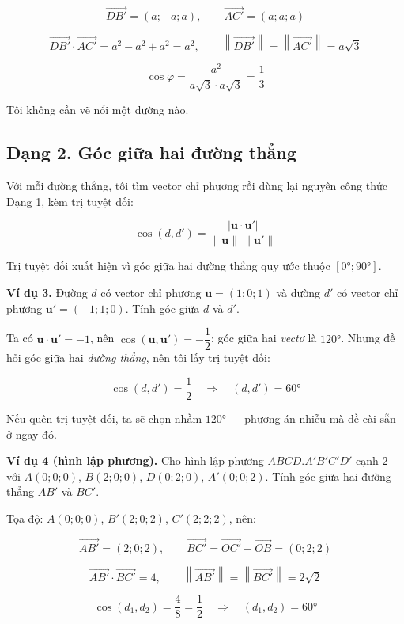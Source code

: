 \documentclass[12pt,a4paper]{article}
\begin{document}
$$
\overrightarrow{DB'} = (a;-a;a),
\qquad
\overrightarrow{AC'} = (a;a;a)
$$

$$
\overrightarrow{DB'}\cdot\overrightarrow{AC'} = a^2-a^2+a^2 = a^2,
\qquad
\left\|\overrightarrow{DB'}\right\| = \left\|\overrightarrow{AC'}\right\| = a\sqrt{3}
$$

$$
\cos\varphi = \frac{a^2}{a\sqrt{3}\cdot a\sqrt{3}} = \frac{1}{3}
$$

Tôi không cần vẽ nổi một đường nào.

\subsection*{Dạng 2. Góc giữa hai đường thẳng}

Với mỗi đường thẳng, tôi tìm vector chỉ phương rồi dùng lại nguyên công thức Dạng 1, kèm trị tuyệt đối:

$$
\cos(d,d') = \frac{|\mathbf{u}\cdot \mathbf{u}'|}{\|\mathbf{u}\|\,\|\mathbf{u}'\|}
$$

Trị tuyệt đối xuất hiện vì góc giữa hai đường thẳng quy ước thuộc $[0°;90°]$.

\textbf{Ví dụ 3.} Đường $d$ có vector chỉ phương $\mathbf{u}=(1;0;1)$ và đường $d'$ có vector chỉ phương $\mathbf{u}'=(-1;1;0)$. Tính góc giữa $d$ và $d'$.

Ta có $\mathbf{u}\cdot\mathbf{u}' = -1$, nên $\cos(\mathbf{u},\mathbf{u}') = -\dfrac{1}{2}$: góc giữa hai \emph{vectơ} là $120°$. Nhưng đề hỏi góc giữa hai \emph{đường thẳng}, nên tôi lấy trị tuyệt đối:

$$
\cos(d,d') = \frac{1}{2}
\quad\Longrightarrow\quad
(d,d') = 60°
$$

Nếu quên trị tuyệt đối, ta sẽ chọn nhầm $120°$ --- phương án nhiễu mà đề cài sẵn ở ngay đó.

\textbf{Ví dụ 4 (hình lập phương).} Cho hình lập phương $ABCD.A'B'C'D'$ cạnh $2$ với $A(0;0;0)$, $B(2;0;0)$, $D(0;2;0)$, $A'(0;0;2)$. Tính góc giữa hai đường thẳng $AB'$ và $BC'$.

Tọa độ: $A(0;0;0)$, $B'(2;0;2)$, $C'(2;2;2)$, nên:

$$
\overrightarrow{AB'} = (2;0;2),
\qquad
\overrightarrow{BC'} = \overrightarrow{OC'}-\overrightarrow{OB} = (0;2;2)
$$

$$
\overrightarrow{AB'}\cdot\overrightarrow{BC'} = 4,
\qquad
\left\|\overrightarrow{AB'}\right\| = \left\|\overrightarrow{BC'}\right\| = 2\sqrt{2}
$$

$$
\cos(d_1,d_2) = \frac{4}{8} = \frac{1}{2}
\quad\Longrightarrow\quad
(d_1,d_2) = 60°
$$
\end{document}
